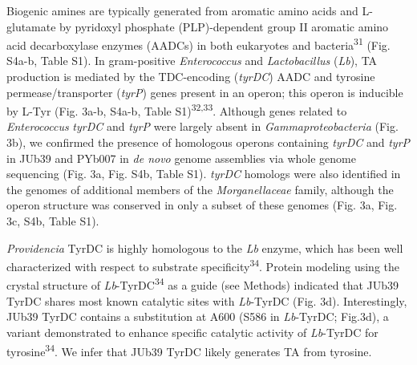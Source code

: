 \documentclass[11pt,]{article}
\begin{document}
Biogenic amines are typically generated from aromatic amino acids and
L-glutamate by pyridoxyl phosphate (PLP)-dependent group II aromatic
amino acid decarboxylase enzymes (AADCs) in both eukaryotes and
bacteria\textsuperscript{31} (Fig. S4a-b, Table S1). In gram-positive
\emph{Enterococcus} and \emph{Lactobacillus} (\emph{Lb}), TA production
is mediated by the TDC-encoding (\emph{tyrDC}) AADC and tyrosine
permease/transporter (\emph{tyrP}) genes present in an operon; this
operon is inducible by L-Tyr (Fig. 3a-b, S4a-b, Table
S1)\textsuperscript{32,33}. Although genes related to
\emph{Enterococcus} \emph{tyrDC} and \emph{tyrP} were largely absent in
\emph{Gammaproteobacteria} (Fig. 3b), we confirmed the presence of
homologous operons containing \emph{tyrDC} and \emph{tyrP} in JUb39 and
PYb007 in \emph{de novo} genome assemblies via whole genome sequencing
(Fig. 3a, Fig. S4b, Table S1). \emph{tyrDC} homologs were also
identified in the genomes of additional members of the
\emph{Morganellaceae} family, although the operon structure was
conserved in only a subset of these genomes (Fig. 3a, Fig. 3c, S4b,
Table S1).

\emph{Providencia} TyrDC is highly homologous to the \emph{Lb} enzyme,
which has been well characterized with respect to substrate
specificity\textsuperscript{34}. Protein modeling using the crystal
structure of \emph{Lb}-TyrDC\textsuperscript{34} as a guide (see
Methods) indicated that JUb39 TyrDC shares most known catalytic sites
with \emph{Lb}-TyrDC (Fig. 3d). Interestingly, JUb39 TyrDC contains a
substitution at A600 (S586 in \emph{Lb}-TyrDC; Fig.3d), a variant
demonstrated to enhance specific catalytic activity of \emph{Lb}-TyrDC
for tyrosine\textsuperscript{34}. We infer that JUb39 TyrDC likely
generates TA from tyrosine.
\end{document}
